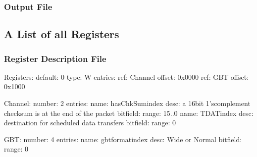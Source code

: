 \documentclass[letterpaper,10pt,english]{sphinxmanual}
\begin{document}
\subsubsection{Output File}
\label{\detokenize{examples:output-file}}
\begin{sphinxVerbatim}[commandchars=\\\{\}]
    
\end{sphinxVerbatim}


\subsection{A List of all Registers}
\label{\detokenize{examples:a-list-of-all-registers}}

\subsubsection{Register Description File}
\label{\detokenize{examples:id1}}
\begin{sphinxVerbatim}[commandchars=\\\{\}]
Registers:
  default: 0
  type: W
  entries:
    \PYGZhy{} ref: Channel
      offset: 0x0000
    \PYGZhy{} ref: GBT
      offset: 0x1000

Channel:
  number: 2
  entries:
    \PYGZhy{} name: hasChkSum\PYGZus{}\PYGZob{}index\PYGZcb{}
      desc: a 16\PYGZhy{}bit 1’s\PYGZhy{}complement checksum is at the end of the packet
      bitfield:
        \PYGZhy{} range: 15..0
    \PYGZhy{} name: TDAT\PYGZus{}\PYGZob{}index\PYGZcb{}
      desc: destination for scheduled data transfers
      bitfield:
        \PYGZhy{} range: 0

GBT:
  number: 4
  entries:
    \PYGZhy{} name: gbt\PYGZus{}format\PYGZus{}\PYGZob{}index\PYGZcb{}
      desc: Wide or Normal
      bitfield:
        \PYGZhy{} range: 0
\end{sphinxVerbatim}
\end{document}
